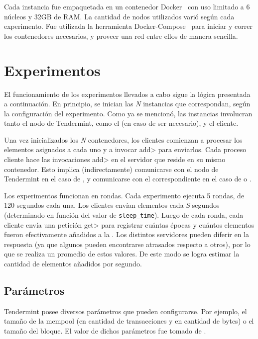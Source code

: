 %
Cada instancia fue empaquetada en un contenedor Docker~\cite{docker} con uso limitado a 6 núcleos y 32GB de RAM.
%
La cantidad de nodos utilizados varió según cada experimento.
%
Fue utilizada la herramienta Docker-Compose~\cite{docker-compose} para iniciar y correr los contenedores necesarios,
y proveer una red entre ellos de manera sencilla.


\section{Experimentos}
El funcionamiento de los experimentos llevados a cabo sigue la lógica presentada a continuación.
%
En principio, se inician las \textit{N} instancias que correspondan, según la configuración del experimento.
%
Como ya se mencionó, las instancias involucran tanto el nodo de Tendermint, como el \collector (en caso de
ser necesario), y el cliente.
%

Una vez inicializados los \textit{N} contenedores, los clientes comienzan a procesar los elementos asignados a cada
uno y a invocar \<add> para enviarlos.
%
Cada proceso cliente hace las invocaciones \<add> en el servidor que reside en su mismo contenedor. 
%
Esto implica (indirectamente) comunicarse con el nodo de Tendermint en el caso de \vanilla, y
comunicarse con el \collector correspondiente en el caso de \compresschain o \hashchain.

Los experimentos funcionan en rondas.
%
Cada experimento ejecuta 5 rondas, de 120 segundos cada una.
%
Los clientes envían elementos cada \textit{S} segundos (determinado en función del valor
de \texttt{sleep\_time}).
%
Luego de cada ronda, cada cliente envía una petición \<get> para registrar cuántas épocas y cuántos
elementos fueron efectivamente añadidos a la \setchain.
%
Los distintos servidores pueden diferir en la respuesta (ya que algunos pueden encontrarse atrasados
respecto a otros), por lo que se realiza un promedio de estos valores.
%
De este modo se logra estimar la cantidad de elementos añadidos por segundo.

\subsection{Parámetros}
Tendermint posee diversos parámetros que pueden configurarse.
Por ejemplo, el tamaño de la mempool
(en cantidad de transacciones y en cantidad de bytes) o el tamaño del bloque.
El valor de dichos parámetros fue tomado de \cite{tendermint.design}.

\bigskip

